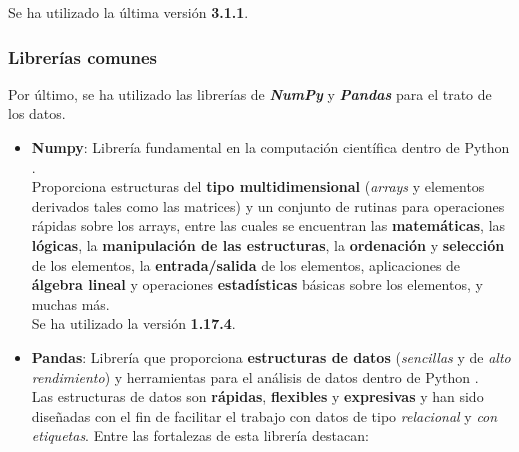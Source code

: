 Se ha utilizado la última versión \textbf{3.1.1}.

\subsubsection{Librerías comunes}

Por último, se ha utilizado las librerías de \textbf{\textit{NumPy}} y \textbf{\textit{Pandas}} para el trato de los datos. 

\begin{itemize}
    \item \textbf{Numpy}: Librería fundamental en la computación científica dentro de Python \cite{numpyDoc}. \\

    Proporciona estructuras del \textbf{tipo multidimensional} (\textit{arrays} y elementos derivados tales como las matrices) y un conjunto de rutinas para operaciones rápidas sobre los arrays, entre las cuales se encuentran las \textbf{matemáticas}, las \textbf{lógicas}, la \textbf{manipulación de las estructuras}, la \textbf{ordenación} y \textbf{selección} de los elementos, la \textbf{entrada/salida} de los elementos, aplicaciones de \textbf{álgebra lineal} y operaciones \textbf{estadísticas} básicas sobre los elementos, y muchas más. \\

    Se ha utilizado la versión \textbf{1.17.4}.
    \item \textbf{Pandas}: Librería que proporciona \textbf{estructuras de datos} (\textit{sencillas} y de \textit{alto rendimiento}) y herramientas para el análisis de datos dentro de Python \cite{pandasDoc}. \\

    Las estructuras de datos son \textbf{rápidas}, \textbf{flexibles} y \textbf{expresivas} y han sido diseñadas con el fin de facilitar el trabajo con datos de tipo \textit{relacional} y \textit{con etiquetas}. Entre las fortalezas de esta librería destacan: 


\end{itemize}

